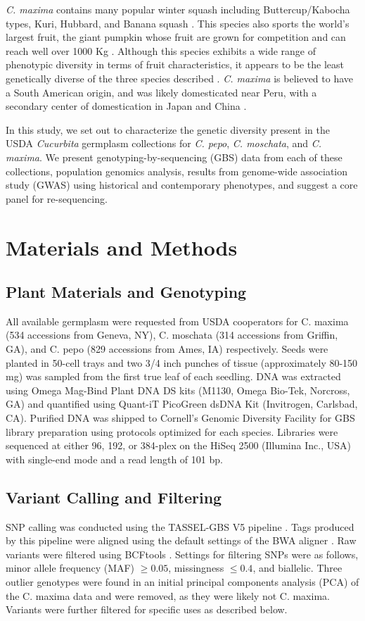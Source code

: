 \documentclass[utf8]{FrontiersinHarvard} %
\begin{document}
\emph{C. maxima} contains many popular winter squash including Buttercup/Kabocha types, Kuri, Hubbard, and Banana squash \citep{Ferriol}.
This species also sports the world's largest fruit, the giant pumpkin whose fruit are grown for competition and can reach well over 1000 Kg \citep{Savage015}.
Although this species exhibits a wide range of phenotypic diversity in terms of fruit characteristics, it appears to be the least genetically diverse of the three species described \citep{Kates2017}.
\emph{C. maxima} is believed to have a South American origin, and was likely domesticated near Peru, with a secondary center of domestication in Japan and China \citep{Nee1990,Sun2017}.

In this study, we set out to characterize the genetic diversity present in the USDA \emph{Cucurbita} germplasm collections for \emph{C. pepo}, \emph{C. moschata}, and \emph{C. maxima}.
We present genotyping-by-sequencing (GBS) data from each of these collections, population genomics analysis, results from genome-wide association study (GWAS) using historical and contemporary phenotypes, and suggest a core panel for re-sequencing.


\section{Materials and Methods}

\subsection{Plant Materials and Genotyping}
All available germplasm were requested from USDA cooperators for C. maxima (534 accessions from Geneva, NY), C. moschata (314 accessions from Griffin, GA), and C. pepo (829 accessions from Ames, IA) respectively. Seeds were planted in 50-cell trays and two 3/4 inch punches of tissue (approximately 80-150 mg) was sampled from the first true leaf of each seedling. DNA was extracted using Omega Mag-Bind Plant DNA DS kits (M1130, Omega Bio-Tek, Norcross, GA) and quantified using Quant-iT PicoGreen dsDNA Kit (Invitrogen, Carlsbad, CA). Purified DNA was shipped to Cornell’s Genomic Diversity Facility for GBS library preparation using protocols optimized for each species. Libraries were sequenced at either 96, 192, or 384-plex on the HiSeq 2500 (Illumina Inc., USA) with single-end mode and a read length of 101 bp.

\subsection{Variant Calling and Filtering}
SNP calling was conducted using the TASSEL-GBS V5 pipeline \citep{Glaubitz2014}. Tags produced by this pipeline were aligned using the default settings of the BWA aligner \citep{Li2009}. Raw variants were filtered using BCFtools \citep{Danecek2021}. Settings for filtering SNPs were as follows, minor allele frequency (MAF) $\geq 0.05$, missingness $\leq 0.4$, and biallelic. Three outlier genotypes were found in an initial principal components analysis (PCA) of the C. maxima data and were removed, as they were likely not C. maxima. Variants were further filtered for specific uses as described below.
\end{document}
